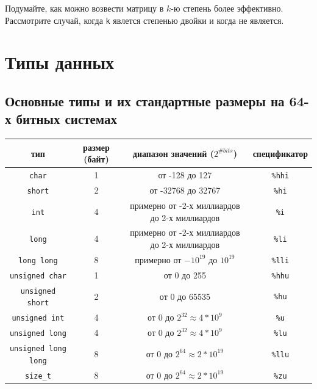 \documentclass[10pt]{article}
\begin{document}
Подумайте, как можно возвести матрицу в $k$-ю степень более эффективно. Рассмотрите случай, когда \texttt{k} явлется степенью двойки и когда не является.




\section*{Типы данных}
\subsection*{Основные типы и их стандартные размеры на 64-х битных системах}
\begin{center}
\begin{tabular}{ c c c c }
 тип & размер (байт) & диапазон значений ($2^{\# bits}$) & спецификатор \\ \hline
 \texttt{char} & 1 & от -128 до 127 & \texttt{\%hhi} \\ 
 \texttt{short} & 2 & от -32768 до 32767 & \texttt{\%hi}  \\  
 \texttt{int} & 4 & примерно от -2-х миллиардов до 2-х миллиардов & \texttt{\%i}  \\  
 \texttt{long} & 4 & примерно от -2-х миллиардов до 2-х миллиардов & \texttt{\%li}  \\  
 \texttt{long long} & 8 & примерно от $-10^{19}$ до $10^{19}$ & \texttt{\%lli}  \\  
 \texttt{unsigned char} & 1 & от 0 до 255 & \texttt{\%hhu} \\ 
 \texttt{unsigned short} & 2 & от 0 до 65535 & \texttt{\%hu}  \\  
 \texttt{unsigned int} & 4 & от 0 до $2^{32} \approx 4*10^{9}$ & \texttt{\%u}  \\  
 \texttt{unsigned long} & 4 & от 0 до $2^{32} \approx 4*10^{9}$ & \texttt{\%lu}  \\  
 \texttt{unsigned long long} & 8 & от 0 до $2^{64} \approx 2*10^{19}$  & \texttt{\%llu}  \\  
 \texttt{size\_t} & 8 & от 0 до $2^{64} \approx 2*10^{19}$ & \texttt{\%zu} \\ \hline
\end{tabular}
\end{center}
\end{document}
